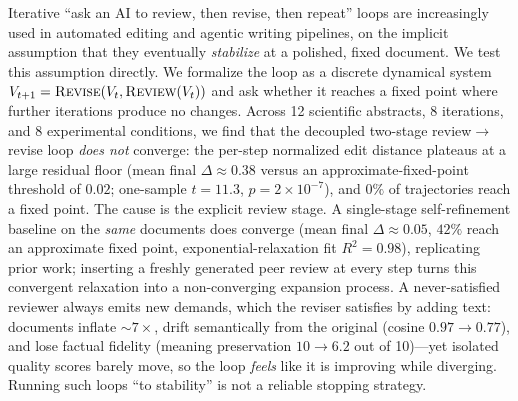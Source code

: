Iterative ``ask an AI to review, then revise, then repeat'' loops are increasingly used in automated editing and agentic writing pipelines, on the implicit assumption that they eventually \emph{stabilize} at a polished, fixed document. We test this assumption directly. We formalize the loop as a discrete dynamical system $V_{t+1} = \textsc{Revise}(V_t, \textsc{Review}(V_t))$ and ask whether it reaches a fixed point where further iterations produce no changes. Across 12 scientific abstracts, 8 iterations, and 8 experimental conditions, we find that the decoupled two-stage review$\to$revise loop \emph{does not} converge: the per-step normalized edit distance plateaus at a large residual floor (mean final $\Delta \approx 0.38$ versus an approximate-fixed-point threshold of $0.02$; one-sample $t=11.3$, $p=2\times10^{-7}$), and $0\%$ of trajectories reach a fixed point. The cause is the explicit review stage. A single-stage self-refinement baseline on the \emph{same} documents does converge (mean final $\Delta \approx 0.05$, $42\%$ reach an approximate fixed point, exponential-relaxation fit $R^2=0.98$), replicating prior work; inserting a freshly generated peer review at every step turns this convergent relaxation into a non-converging expansion process. A never-satisfied reviewer always emits new demands, which the reviser satisfies by adding text: documents inflate $\sim 7\times$, drift semantically from the original (cosine $0.97\to 0.77$), and lose factual fidelity (meaning preservation $10\to 6.2$ out of 10)—yet isolated quality scores barely move, so the loop \emph{feels} like it is improving while diverging. Running such loops ``to stability'' is not a reliable stopping strategy.
